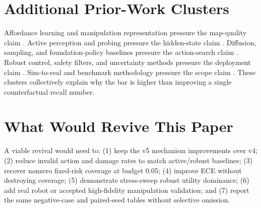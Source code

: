 \documentclass{article}
\begin{document}
\citep{r103390robotics10040109,r10117702783649231196925,r101109fuzzieee20198858847,r1011093477678626,r1011771729881419900066} \citep{r101109iros4574320209341337,r101109robot20031241772,r101109robot19851087316,r1015612300000082,r101109access20233312940} \citep{r103390ijgi10100664,r101109access20213097893,r1011771059712317726357,r240610721v1,r101002rob21936} \citep{r1011770278364911421039,r1048550arxiv200407400,r101002rob22407,r103389frobt20241288818,r101002rob22333} \citep{robotnavigationinunseenspacesusinganabstra,r221005714v4,r101007s11370026007074,r241003509v1,r101109access20243367589} \citep{r101002rob21974,r103390logistics9030124,r101109tcds20162614992,r10117702783649211045736,r101109icra20188460695} \citep{r101109tiv20233328013,r1048550arxiv190306684,r101109iros20031250630,r101109robot20031241816,r103389frobt20231065394}

\section{Additional Prior-Work Clusters}
Affordance learning and manipulation representation pressure the map-quality claim \citep{r201008202v4,r101109icra20146907666,r1015607rss2017xiii058,r101109access20243387539,r101093bioinformaticsbtac053,r190305690v2,r101115ipc201031438,r103233978161499480035}. Active perception and probing pressure the hidden-state claim \citep{r101007978303036150146,r101109access20203045027,r101038s4146702121091w,r101109icra20115979638,r101109robio20157419073,r103390machines13060474,r103390s21030816,r101109humanoids20167803373}. Diffusion, sampling, and foundation-policy baselines pressure the action-search claim \citep{r101109access20192931910,r101109tcds20233277288,r101109icra20198793769,r1031234osfio4a5uh,r10111514069346,r101109iros5116820219636579,r101002rob22431,r101109access20243354775}. Robust control, safety filters, and uncertainty methods pressure the deployment claim \citep{r1048550arxiv210808481,r101109tie20213095812,bayesianmaplearningindynamicenvironments,r103390s20236988,r101162colia00404,r103390en15176256,r1011770278364913478446,r101109robot20105509418}. Sim-to-real and benchmark methodology pressure the scope claim \citep{r103390electronics12132925,r101002rob22004,r103390app12115420,r101038s41524024012096,r103390robotics9040077,r101109access20202980298,r101109robio4954220198961711,r101002rob22143}. These clusters collectively explain why the bar is higher than improving a single counterfactual recall number.

\section{What Would Revive This Paper}
A viable revival would need to: (1) keep the v5 mechanism improvements over v4; (2) reduce invalid action and damage rates to match active/robust baselines; (3) recover nonzero fixed-risk coverage at budget 0.05; (4) improve ECE without destroying coverage; (5) demonstrate stress-sweep robust utility dominance; (6) add real robot or accepted high-fidelity manipulation validation; and (7) report the same negative-case and paired-seed tables without selective omission.
\end{document}
